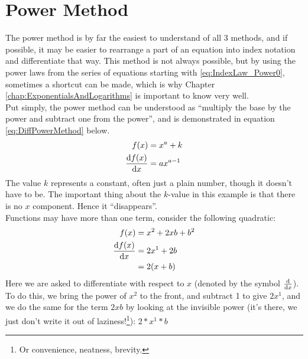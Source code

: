 \section{Power Method}
\label{sec:PowerMethod}
The power method is by far the easiest to understand of all 3 methods, and if
possible, it may be easier to rearrange a part of an equation into index
notation and differentiate that way. This method is not always possible,
but by using the power laws from the series of equations starting with
\ref{eq:IndexLaw_Power0}, sometimes a shortcut can be made, which is why
Chapter \ref{chap:ExponentialsAndLogarithms} is important to know very well.
\\
Put simply, the power method can be understood as ``multiply the base by the
power and subtract one from the power'', and is demonstrated in equation
\ref{eq:DiffPowerMethod} below.
\begin{align}
             f(x) & = {x}^{a} + k \label{eq:DiffPowerMethodKValue} \\
  \frac{\mathrm{d}f(x)}{\mathrm{d}x} & = a{x}^{a-1} \label{eq:DiffPowerMethod}
\end{align}
The value $k$ represents a constant, often just a plain number, though it
doesn't have to be. The important thing about the $k$-value in this example is
that there is no $x$ component. Hence it ``disappears''.\\
Functions may have more than one term, consider the following quadratic:
\begin{align}
  f(x)             & = {x}^{2} + 2xb + {b}^{2} \\
  \frac{\mathrm{d}f(x)}{\mathrm{d}x} & = 2{x}^{1} + 2b \\
                   & = 2(x+b) \label{eq:DiffPowerMethodRespectTo}
\end{align}
Here we are asked to differentiate with respect to $x$ (denoted by the symbol
$\frac{\mathrm{d}}{\mathrm{d}x}$). To do this, we bring the power of ${x}^{2}$ to the front, and
subtract 1 to give $2{x}^{1}$, and we do the same for the term ${2xb}$ by
looking at the invisible power (it's there, we just don't write it out of
laziness!\footnote{Or convenience, neatness, brevity.}): $2*{x}^{1}*b$
